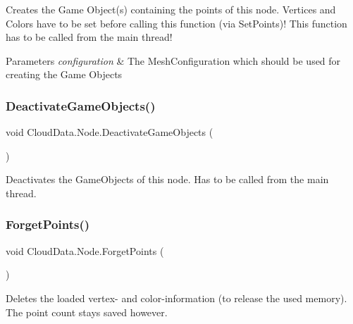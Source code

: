 Creates the Game Object(s) containing the points of this node. Vertices and Colors have to be set before calling this function (via Set\+Points)! This function has to be called from the main thread! 


\begin{DoxyParams}{Parameters}
{\em configuration} & The Mesh\+Configuration which should be used for creating the Game Objects\\
\hline
\end{DoxyParams}
\mbox{\label{class_cloud_data_1_1_node_a397ec14bfc75899441b6edfcabb004ad}} 
\subsubsection{\texorpdfstring{Deactivate\+Game\+Objects()}{DeactivateGameObjects()}}
{\footnotesize\ttfamily void Cloud\+Data.\+Node.\+Deactivate\+Game\+Objects (\begin{DoxyParamCaption}{ }\end{DoxyParamCaption})\hspace{0.3cm}{\ttfamily [inline]}}



Deactivates the Game\+Objects of this node. Has to be called from the main thread. 

\mbox{\label{class_cloud_data_1_1_node_a42cf1e1f98f40a542173abce2b82a078}} 
\subsubsection{\texorpdfstring{Forget\+Points()}{ForgetPoints()}}
{\footnotesize\ttfamily void Cloud\+Data.\+Node.\+Forget\+Points (\begin{DoxyParamCaption}{ }\end{DoxyParamCaption})\hspace{0.3cm}{\ttfamily [inline]}}



Deletes the loaded vertex-\/ and color-\/information (to release the used memory). The point count stays saved however. 

